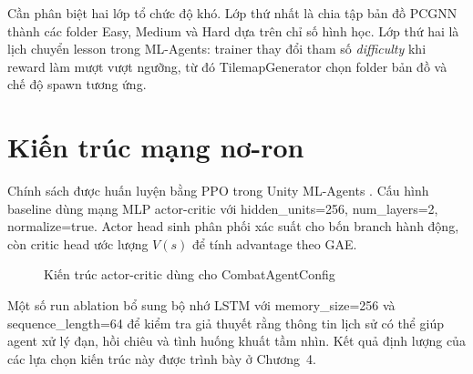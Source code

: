 Cần phân biệt hai lớp tổ chức độ khó. Lớp thứ nhất là chia tập bản đồ PCGNN thành các folder Easy, Medium và Hard dựa trên chỉ số hình học. Lớp thứ hai là lịch chuyển lesson trong ML-Agents: trainer thay đổi tham số \emph{difficulty} khi reward làm mượt vượt ngưỡng, từ đó TilemapGenerator chọn folder bản đồ và chế độ spawn tương ứng.

\section{Kiến trúc mạng nơ-ron}

Chính sách được huấn luyện bằng PPO trong Unity ML-Agents \cite{Juliani2018}. Cấu hình baseline dùng mạng MLP actor-critic với hidden\_units=256, num\_layers=2, normalize=true. Actor head sinh phân phối xác suất cho bốn branch hành động, còn critic head ước lượng $V(s)$ để tính advantage theo GAE.

\begin{figure}[H]
    \centering
    \caption{Kiến trúc actor-critic dùng cho CombatAgentConfig}
    \label{fig:actor_critic_architecture}
\end{figure}

Một số run ablation bổ sung bộ nhớ LSTM với memory\_size=256 và sequence\_length=64 để kiểm tra giả thuyết rằng thông tin lịch sử có thể giúp agent xử lý đạn, hồi chiêu và tình huống khuất tầm nhìn. Kết quả định lượng của các lựa chọn kiến trúc này được trình bày ở Chương~4.

